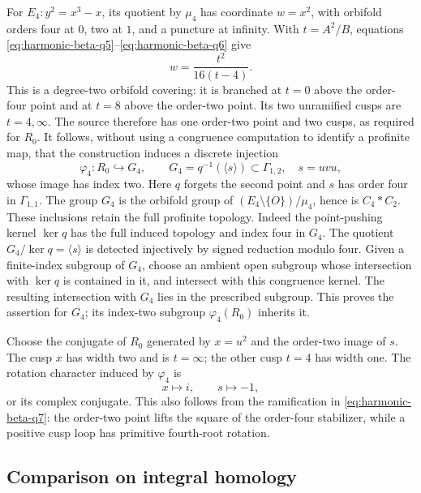 For \(E_4:y^2=x^3-x\), its quotient by \(\mu_4\) has
coordinate \(w=x^2\), with orbifold orders four at \(0\),
two at \(1\), and a puncture at infinity. With
\(t=A^2/B\), equations \eqref{eq:harmonic-beta-q5}--\eqref{eq:harmonic-beta-q6} give
\begin{equation}
                      w=\frac{t^2}{16(t-4)}.                \label{eq:harmonic-beta-q7}
\end{equation}
This is a degree-two orbifold covering: it is branched at
\(t=0\) above the order-four point and at \(t=8\) above the
order-two point. Its two unramified cusps are \(t=4,\infty\).
The source therefore has one order-two point and two cusps,
as required for \(R_0\).
It follows, without using a congruence computation to
identify a profinite map, that the construction induces a
discrete injection
\[
 \varphi_4:R_0\hookrightarrow G_4,\qquad
 G_4=q^{-1}(\langle s\rangle)\subset\Gamma_{1,2},
 \quad s=uvu,
\]
whose image has index two. Here \(q\) forgets the second
point and \(s\) has order four in \(\Gamma_{1,1}\).
The group \(G_4\) is the orbifold group of
\((E_4\setminus\{O\})/\mu_4\), hence is \(C_4*C_2\).
These inclusions retain the full profinite topology. Indeed the
point-pushing kernel \(\ker q\) has the full induced topology and
index four in \(G_4\). The quotient \(G_4/\ker q=\langle s\rangle\)
is detected injectively by signed reduction modulo four. Given a
finite-index subgroup of \(G_4\), choose an ambient open subgroup
whose intersection with \(\ker q\) is contained in it, and intersect
with this congruence kernel. The resulting intersection with
\(G_4\) lies in the prescribed subgroup. This proves the assertion
for \(G_4\); its index-two subgroup \(\varphi_4(R_0)\) inherits it.

Choose the conjugate of \(R_0\) generated by \(x=u^2\) and
the order-two image of \(s\). The cusp \(x\) has width two
and is \(t=\infty\); the other cusp \(t=4\) has width one.
The rotation character induced by \(\varphi_4\) is
\begin{equation}
                        x\longmapsto i,\qquad
                        s\longmapsto-1,                    \label{eq:harmonic-beta-q8}
\end{equation}
or its complex conjugate. This also follows from the
ramification in \eqref{eq:harmonic-beta-q7}: the order-two point lifts the square
of the order-four stabilizer, while a positive cusp loop
has primitive fourth-root rotation.

\subsection{Comparison on integral homology}

